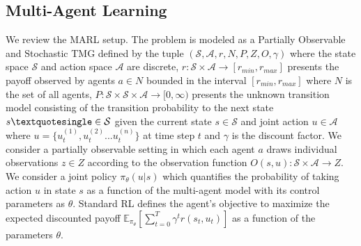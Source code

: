 \documentclass{article}
\begin{document}
\begin{multicols}{2}
\subsection{Multi-Agent Learning}
We review the MARL setup. The problem is modeled as a Partially Observable and Stochastic TMG \cite{rl} defined by the tuple $(\mathcal{S},\mathcal{A},r,N,P,Z,O,\gamma)$ where the state space $\mathcal{S}$ and action space $\mathcal{A}$ are discrete, $r: \mathcal{S} \times \mathcal{A} \rightarrow [r_{min},r_{max}]$ presents the payoff observed by agents $a \in N$ bounded in the interval $[r_{min},r_{max}]$ where $N$ is the set of all agents, $P: \mathcal{S} \times \mathcal{S} \times \mathcal{A} \rightarrow [0,\infty)$ presents the unknown transition model consisting of the transition probability to the next state $s\textquotesingle \in \mathcal{S}$ given the current state $s \in \mathcal{S}$ and joint action $u \in \mathcal{A}$ where $u = \{u_{t}^{(1)},u_{t}^{(2)}...u_{t}^{(n)}\}$ at time step $t$ and $\gamma$ is the discount factor. We consider a partially observable setting in which each agent $a$ draws individual observations $z \in Z$ according to the observation function $O(s,u): \mathcal{S} \times \mathcal{A} \rightarrow Z$. We consider a joint policy $\pi_{\theta}({u|s})$ which quantifies the probability of taking action $u$ in state $s$ as a function of the multi-agent model with its control parameters as $\theta$. Standard RL defines the agent's objective to maximize the expected discounted payoff $\mathbb{E}_{\pi_{\theta}}[\sum_{t=0}^{T}\gamma^{t}r(s_{t},u_{t})]$ as a function of the parameters $\theta$. 


\end{multicols}
\end{document}

